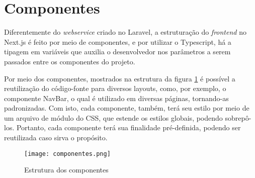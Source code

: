 
\section{Componentes}
Diferentemente do \textit{webservice} criado no Laravel, a estruturação do \textit{frontend} no Next.js é feito por meio de componentes, e por utilizar o Typescript, há a tipagem em variáveis que auxilia o desenvolvedor nos parâmetros a serem passados entre os componentes do projeto.

Por meio dos componentes, mostrados na estrutura da figura \ref{componentes} é possível a reutilização do código-fonte para diversos layouts, como, por exemplo, o componente NavBar, o qual é utilizado em diversas páginas, tornando-as padronizadas. Com isto, cada componente, também, terá seu estilo por meio de um arquivo de módulo do CSS, que estende os estilos globais, podendo sobrepô-los. Portanto, cada componente terá sua finalidade pré-definida, podendo ser reutilizada caso sirva o propósito.

\begin{figure}[H]
    \caption{\label{componentes}Estrutura dos componentes}
    \vspace{5pt}
    \centering
    \texttt{[image: componentes.png]}
    \vspace{5pt}
\end{figure}

